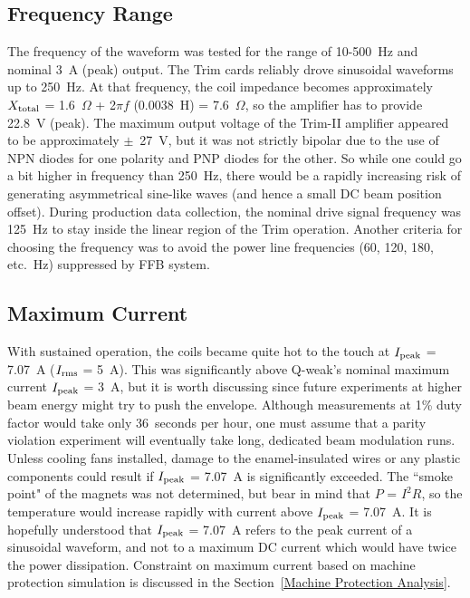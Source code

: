 \subsection{Frequency Range}
\label{Frequency Range}
The frequency of the waveform was tested for the range of 10-500~Hz and nominal 3~A (peak) output. The Trim cards reliably drove sinusoidal waveforms up to 250~Hz. At that frequency, the coil impedance becomes approximately $X_{\rm total}$ = 1.6~$\Omega$ + 2$\pi f$ (0.0038~H) = 7.6~$\Omega$, so the amplifier has to provide 22.8~V (peak). The maximum output voltage of the Trim-II amplifier appeared to be approximately $\pm$~27~V, but it was not strictly bipolar due to the use of NPN diodes for one polarity and PNP diodes for the other. So while one could go a bit higher in frequency than 250~Hz, there would be a rapidly increasing risk of generating asymmetrical sine-like waves (and hence a small DC beam position offset). During production data collection, the nominal drive signal frequency was 125~Hz to stay inside the linear region of the Trim operation. Another criteria for choosing the frequency was to avoid the power line frequencies (60, 120, 180, etc.~Hz) suppressed by FFB system.

\subsection{Maximum Current}
\label{Maximum Current}
With sustained operation, the coils became quite hot to the touch at $I_{\rm peak}$ = 7.07~A ($I_{\rm rms}$ = 5~A). This was significantly above Q-weak's nominal maximum current $I_{\rm peak}$ = 3~A, but it is worth discussing since future experiments at higher beam energy might try to push the envelope. Although measurements at 1\% duty factor would take only 36~seconds per hour, one must assume that a parity violation experiment will eventually take long, dedicated beam modulation runs. Unless cooling fans installed, damage to the enamel-insulated wires or any plastic components could result if $I_{\rm peak}$ = 7.07~A is significantly exceeded. The ``smoke point" of the magnets was not determined, but bear in mind that $P$ = $I^{2}R$, so the temperature would increase rapidly with current above $I_{\rm peak}$ = 7.07~A. It is hopefully understood that $I_{\rm peak}$  = 7.07~A refers to the peak current of a sinusoidal waveform, and not to a maximum DC current which would have twice the power dissipation. Constraint on maximum current based on machine protection simulation is discussed in the Section~\ref{Machine Protection Analysis}.
 

